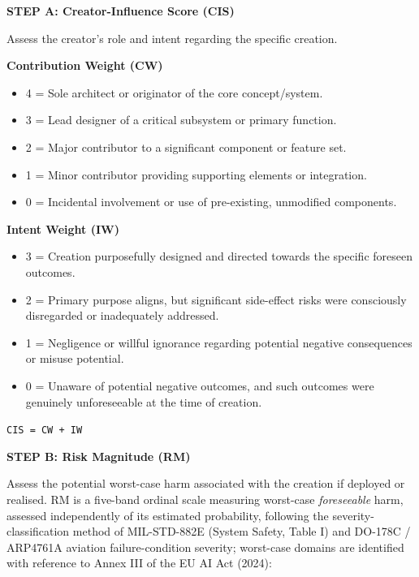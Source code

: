 \documentclass[11pt]{article}
\begin{document}
\textbf{STEP A: Creator-Influence Score (CIS)}

Assess the creator's role and intent regarding the specific creation.


\textbf{Contribution Weight (CW)}

\begin{itemize}\setlength\itemsep{0pt}
\item 4 = Sole architect or originator of the core concept/system.
\item 3 = Lead designer of a critical subsystem or primary function.
\item 2 = Major contributor to a significant component or feature set.
\item 1 = Minor contributor providing supporting elements or integration.
\item 0 = Incidental involvement or use of pre-existing, unmodified components.
\end{itemize}


\textbf{Intent Weight (IW)}

\begin{itemize}\setlength\itemsep{0pt}
\item 3 = Creation purposefully designed and directed towards the specific foreseen outcomes.
\item 2 = Primary purpose aligns, but significant side-effect risks were consciously disregarded or inadequately addressed.
\item 1 = Negligence or willful ignorance regarding potential negative consequences or misuse potential.
\item 0 = Unaware of potential negative outcomes, and such outcomes were genuinely unforeseeable at the time of creation.
\end{itemize}


\texttt{CIS = CW + IW}


\textbf{STEP B: Risk Magnitude (RM)}

Assess the potential worst-case harm associated with the creation if deployed or realised. RM is a five-band ordinal scale measuring worst-case \textit{foreseeable} harm, assessed independently of its estimated probability, following the severity-classification method of MIL-STD-882E (System Safety, Table I) and DO-178C / ARP4761A aviation failure-condition severity; worst-case domains are identified with reference to Annex III of the EU AI Act (2024):
\end{document}
